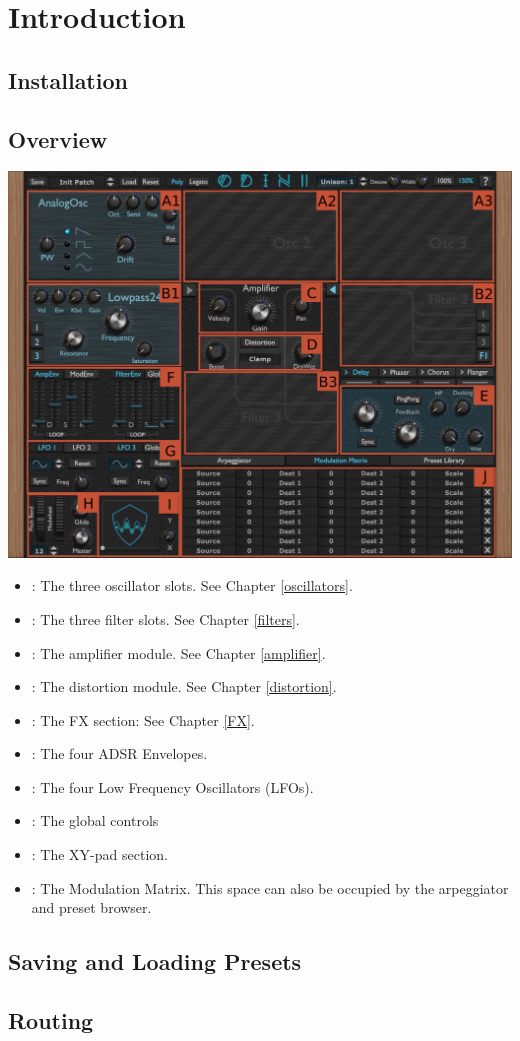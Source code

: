 \chapter{Introduction}
\section{Installation}
\clearpage
\section{Overview}
\begin{center}
    \includegraphics[width=\textwidth]{graphics/overview.png}
\end{center}

\begin{itemize}
    \item {}: The three oscillator slots. See Chapter \ref{oscillators}.
    \item {}: The three filter slots. See Chapter \ref{filters}.
    \item {}: The amplifier module. See Chapter \ref{amplifier}.
    \item {}: The distortion module. See Chapter \ref{distortion}.
    \item {}: The FX section: See Chapter \ref{FX}.
    \item {}: The four ADSR Envelopes.
    \item {}: The four Low Frequency Oscillators (LFOs).
    \item {}: The global controls
    \item {}: The XY-pad section.
    \item {}: The Modulation Matrix. This space can also be occupied by the arpeggiator and preset browser.
\end{itemize}
\section{Saving and Loading Presets}
\section{Routing}
